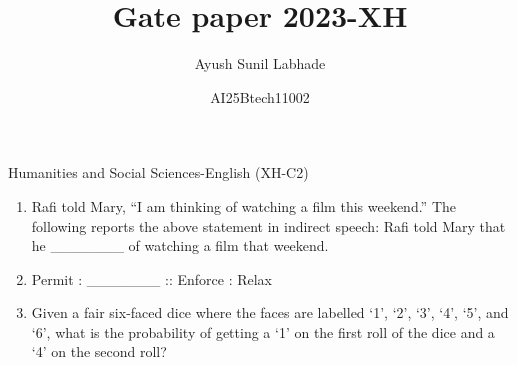\documentclass[12pt]{article}
\theoremstyle{remark}
\begin{document}
\title{\vspace{-5cm}Gate paper 2023-XH}
\author{Ayush Sunil Labhade}
\date{AI25Btech11002}
\maketitle
\begin{flushright}Humanities and Social Sciences-English (XH-C2)\end{flushright} 
\begin{enumerate}
\item Rafi told Mary, “I am thinking of watching a film this weekend.” 
The following reports the above statement in indirect speech:
Rafi told Mary that he \_\_\_\_\_\_\_ of watching a film that weekend. 
\begin{enumerate}  \end{enumerate}
\hfill{}
\item Permit : \_\_\_\_\_\_\_ :: Enforce : Relax 
\newline 
\begin{enumerate}  \end{enumerate}
\hfill{}
\item Given a fair six-faced dice where the faces are labelled ‘1’, ‘2’, ‘3’, ‘4’, ‘5’, and ‘6’,
what is the probability of getting a ‘1’ on the first roll of the dice and a ‘4’ on the
second roll? 
\begin{enumerate} 
\end{enumerate}
\end{enumerate}
\end{document}
